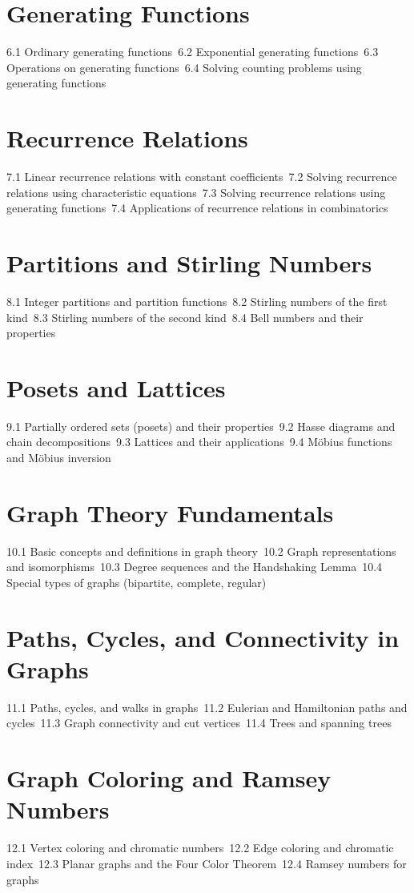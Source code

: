 \section{Generating Functions}
6.1 Ordinary generating functions\
6.2 Exponential generating functions\
6.3 Operations on generating functions\
6.4 Solving counting problems using generating functions\
\section{Recurrence Relations}
7.1 Linear recurrence relations with constant coefficients\
7.2 Solving recurrence relations using characteristic equations\
7.3 Solving recurrence relations using generating functions\
7.4 Applications of recurrence relations in combinatorics\
\section{Partitions and Stirling Numbers}
8.1 Integer partitions and partition functions\
8.2 Stirling numbers of the first kind\
8.3 Stirling numbers of the second kind\
8.4 Bell numbers and their properties\
\section{Posets and Lattices}
9.1 Partially ordered sets (posets) and their properties\
9.2 Hasse diagrams and chain decompositions\
9.3 Lattices and their applications\
9.4 Möbius functions and Möbius inversion\
\section{Graph Theory Fundamentals}
10.1 Basic concepts and definitions in graph theory\
10.2 Graph representations and isomorphisms\
10.3 Degree sequences and the Handshaking Lemma\
10.4 Special types of graphs (bipartite, complete, regular)\
\section{Paths, Cycles, and Connectivity in Graphs}
11.1 Paths, cycles, and walks in graphs\
11.2 Eulerian and Hamiltonian paths and cycles\
11.3 Graph connectivity and cut vertices\
11.4 Trees and spanning trees\
\section{Graph Coloring and Ramsey Numbers}
12.1 Vertex coloring and chromatic numbers\
12.2 Edge coloring and chromatic index\
12.3 Planar graphs and the Four Color Theorem\
12.4 Ramsey numbers for graphs\
